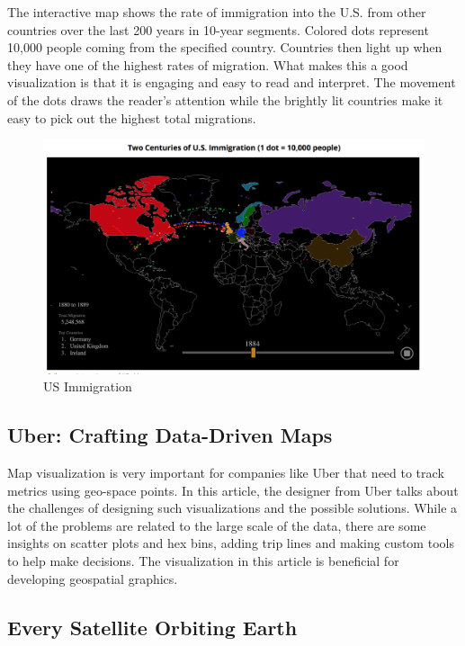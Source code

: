 \documentclass[]{book}
\theoremstyle{definition}
\theoremstyle{definition}
\theoremstyle{definition}
\theoremstyle{remark}
\begin{document}
The interactive map shows the rate of immigration into the U.S. from
other countries over the last 200 years in 10-year segments. Colored
dots represent 10,000 people coming from the specified country.
Countries then light up when they have one of the highest rates of
migration. What makes this a good visualization is that it is engaging
and easy to read and interpret. The movement of the dots draws the
reader's attention while the brightly lit countries make it easy to pick
out the highest total migrations.

\begin{figure}
\centering
\includegraphics{images/immigration.png}
\caption{US Immigration}
\end{figure}

\subsection{Uber: Crafting Data-Driven
Maps}\label{uber-crafting-data-driven-maps}

\citep{uber_maps} Map visualization is very important for companies like
Uber that need to track metrics using geo-space points. In this article,
the designer from Uber talks about the challenges of designing such
visualizations and the possible solutions. While a lot of the problems
are related to the large scale of the data, there are some insights on
scatter plots and hex bins, adding trip lines and making custom tools to
help make decisions. The visualization in this article is beneficial for
developing geospatial graphics.

\subsection{Every Satellite Orbiting
Earth}\label{every-satellite-orbiting-earth}
\end{document}
